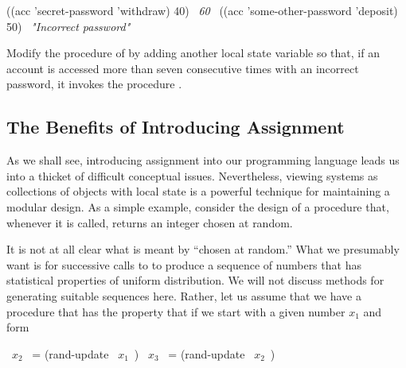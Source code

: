 \begin{exerciseGroup}
\begin{codeBlock}
((acc 'secret-password 'withdraw) 40)
~\textit{60}~
((acc 'some-other-password 'deposit) 50)
~\textit{"Incorrect password"}~
\end{codeBlock}

\label{Exercise 3.4}
 Modify the 
procedure of  by adding another local state variable so that,
if an account is accessed more than seven consecutive times with an incorrect
password, it invokes the procedure .
\end{exerciseGroup}

\subsection{The Benefits of Introducing Assignment}
\label{Section 3.1.2}

As we shall see, introducing assignment into our programming language leads us
into a thicket of difficult conceptual issues.  Nevertheless, viewing systems
as collections of objects with local state is a powerful technique for
maintaining a modular design.  As a simple example, consider the design of a
procedure  that, whenever it is called, returns an integer chosen at
random.

It is not at all clear what is meant by ``chosen at random.''  What we
presumably want is for successive calls to  to produce a sequence of
numbers that has statistical properties of uniform distribution.  We will not
discuss methods for generating suitable sequences here.  Rather, let us assume
that we have a procedure  that has the property that if we
start with a given number \( x_1 \) and form

\begin{codeBlock}
~\(x_2 \)~ = (rand-update ~\(x_1 \)~)
~\(x_3 \)~ = (rand-update ~\(x_2 \)~)
\end{codeBlock}

